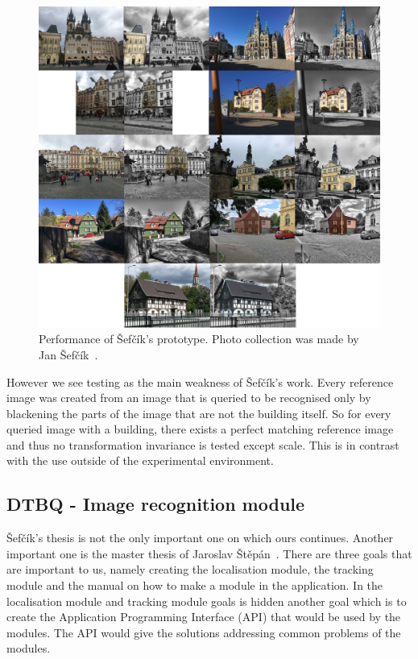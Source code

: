 \documentclass[thesis=B,english]{FITthesis}[2019/12/23]
\begin{document}
                \begin{figure}
                    \centering
                    \includegraphics[width = 1\linewidth]{pictures/Sefciks_prototype_results.jpg}
                    \caption[Performance of Šefčík's prototype]{Performance of Šefčík's prototype. Photo collection was made by Jan Šefčík~\cite{Sefcik2020}.}
                    \label{fig:Sefciks_prototype_results}
                \end{figure}

                However we see testing as the main weakness of Šefčík's work. Every reference image was created from an image that is queried to be recognised only by blackening the parts of the image that are not the building itself. So for every queried image with a building, there exists a perfect matching reference image and thus no transformation invariance is tested except scale. This is in contrast with the use outside of the experimental environment.
                
            \subsection{DTBQ - Image recognition module} \label{sec:stepan}
                Šefčík's thesis is not the only important one on which ours continues. Another important one is the master thesis of Jaroslav Štěpán~\cite{Stepan2019}. There are three goals that are important to us, namely creating the localisation module, the tracking module and the manual on how to make a module in the application. In the localisation module and tracking module goals is hidden another goal which is to create the Application Programming Interface (API) that would be used by the modules. The API would give the solutions addressing common problems of the modules.
                
\end{document}
